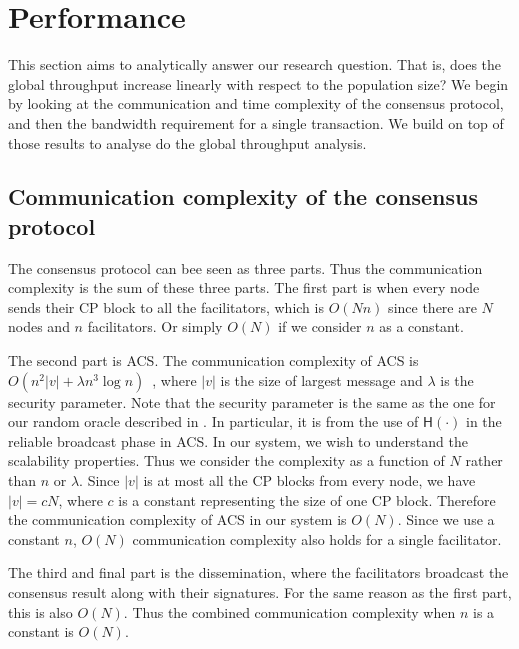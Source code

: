 \section{Performance}
\label{sec:performance-analysis}
This section aims to analytically answer our research question.
That is, does the global throughput increase linearly with respect to the population size?
We begin by looking at the communication and time complexity of the consensus protocol,
and then the bandwidth requirement for a single transaction.
We build on top of those results to analyse do the global throughput analysis.

\subsection{Communication complexity of the consensus protocol}
\label{sec:cons-complexity}
The consensus protocol can bee seen as three parts.
Thus the communication complexity is the sum of these three parts.
The first part is when every node sends their CP block to all the facilitators, which is $O(Nn)$ since there are $N$ nodes and $n$ facilitators.
Or simply $O(N)$ if we consider $n$ as a constant.

The second part is ACS.
The communication complexity of ACS is $O(n^2|v| + \lambda n^3 \log n)$~\cite{miller2016honey},
where $|v|$ is the size of largest message and $\lambda$ is the security parameter.
Note that the security parameter is the same as the one for our random oracle described in .
In particular, it is from the use of $\textsf{H}(\cdot)$ in the reliable broadcast phase in ACS.
In our system, we wish to understand the scalability properties.
Thus we consider the complexity as a function of $N$ rather than $n$ or $\lambda$.
Since $|v|$ is at most all the CP blocks from every node, we have $|v| = cN$,
where $c$ is a constant representing the size of one CP block.
Therefore the communication complexity of ACS in our system is $O(N)$.
Since we use a constant $n$, $O(N)$ communication complexity also holds for a single facilitator.

The third and final part is the dissemination, where the facilitators broadcast the consensus result along with their signatures.
For the same reason as the first part, this is also $O(N)$.
Thus the combined communication complexity when $n$ is a constant is $O(N)$.


